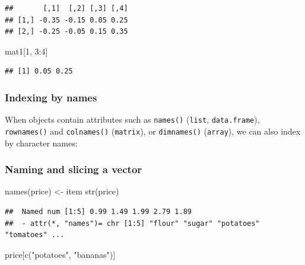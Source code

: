 \documentclass[
  11pt,
]{article}
\newenvironment{Shaded}{\begin{snugshade}}{\end{snugshade}}
\newcommand{\DecValTok}[1]{\textcolor[rgb]{0.00,0.00,0.81}{#1}}
\newcommand{\FunctionTok}[1]{\textcolor[rgb]{0.00,0.00,0.00}{#1}}
\newcommand{\NormalTok}[1]{#1}
\newcommand{\OtherTok}[1]{\textcolor[rgb]{0.56,0.35,0.01}{#1}}
\newcommand{\SpecialCharTok}[1]{\textcolor[rgb]{0.00,0.00,0.00}{#1}}
\newcommand{\StringTok}[1]{\textcolor[rgb]{0.31,0.60,0.02}{#1}}
\begin{document}
\begin{verbatim}
##       [,1]  [,2] [,3] [,4]
## [1,] -0.35 -0.15 0.05 0.25
## [2,] -0.25 -0.05 0.15 0.35
\end{verbatim}

\begin{Shaded}
\begin{Highlighting}[]
\NormalTok{mat1[}\DecValTok{1}\NormalTok{, }\DecValTok{3}\SpecialCharTok{:}\DecValTok{4}\NormalTok{]}
\end{Highlighting}
\end{Shaded}

\begin{verbatim}
## [1] 0.05 0.25
\end{verbatim}

\hypertarget{indexing-by-names}{%
\subsubsection{Indexing by names}\label{indexing-by-names}}

When objects contain attributes such as \texttt{names()} (\texttt{list}, \texttt{data.frame}), \texttt{rownames()} and \texttt{colnames()} (\texttt{matrix}), or \texttt{dimnames()} (\texttt{array}), we can also index by character names:

\hypertarget{naming-and-slicing-a-vector}{%
\subsubsection{Naming and slicing a vector}\label{naming-and-slicing-a-vector}}

\begin{Shaded}
\begin{Highlighting}[]
\FunctionTok{names}\NormalTok{(price) }\OtherTok{\textless{}{-}}\NormalTok{ item}
\FunctionTok{str}\NormalTok{(price)}
\end{Highlighting}
\end{Shaded}

\begin{verbatim}
##  Named num [1:5] 0.99 1.49 1.99 2.79 1.89
##  - attr(*, "names")= chr [1:5] "flour" "sugar" "potatoes" "tomatoes" ...
\end{verbatim}

\begin{Shaded}
\begin{Highlighting}[]
\NormalTok{price[}\FunctionTok{c}\NormalTok{(}\StringTok{"potatoes"}\NormalTok{, }\StringTok{"bananas"}\NormalTok{)]}
\end{Highlighting}
\end{Shaded}
\end{document}
